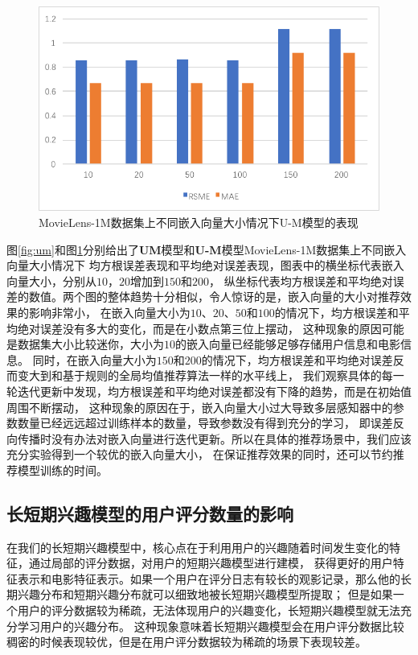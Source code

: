 \begin{figure}[htbp]
    \centering
    \includegraphics[scale=0.7]{images/U_M.pdf}
    \caption{MovieLens-1M数据集上不同嵌入向量大小情况下U-M模型的表现}
    \label{fig:u_m}
\end{figure}

图\ref{fig:um}和图\ref{fig:u_m}分别给出了\textbf{UM}模型和\textbf{U-M}模型MovieLens-1M数据集上不同嵌入向量大小情况下
均方根误差表现和平均绝对误差表现，图表中的横坐标代表嵌入向量大小，分别从$10$，$20$增加到$150$和$200$，
纵坐标代表均方根误差和平均绝对误差的数值。两个图的整体趋势十分相似，令人惊讶的是，嵌入向量的大小对推荐效果的影响非常小，
在嵌入向量大小为$10$、$20$、$50$和$100$的情况下，均方根误差和平均绝对误差没有多大的变化，而是在小数点第三位上摆动，
这种现象的原因可能是数据集大小比较迷你，大小为$10$的嵌入向量已经能够足够存储用户信息和电影信息。
同时，在嵌入向量大小为$150$和$200$的情况下，均方根误差和平均绝对误差反而变大到和基于规则的全局均值推荐算法一样的水平线上，
我们观察具体的每一轮迭代更新中发现，均方根误差和平均绝对误差都没有下降的趋势，而是在初始值周围不断摆动，
这种现象的原因在于，嵌入向量大小过大导致多层感知器中的参数数量已经远远超过训练样本的数量，导致参数没有得到充分的学习，
即误差反向传播时没有办法对嵌入向量进行迭代更新。所以在具体的推荐场景中，我们应该充分实验得到一个较优的嵌入向量大小，
在保证推荐效果的同时，还可以节约推荐模型训练的时间。

\subsection{长短期兴趣模型的用户评分数量的影响}
在我们的长短期兴趣模型中，核心点在于利用用户的兴趣随着时间发生变化的特征，通过局部的评分数据，对用户的短期兴趣模型进行建模，
获得更好的用户特征表示和电影特征表示。如果一个用户在评分日志有较长的观影记录，那么他的长期兴趣分布和短期兴趣分布就可以细致地被长短期兴趣模型所提取；
但是如果一个用户的评分数据较为稀疏，无法体现用户的兴趣变化，长短期兴趣模型就无法充分学习用户的兴趣分布。
这种现象意味着长短期兴趣模型会在用户评分数据比较稠密的时候表现较优，但是在用户评分数据较为稀疏的场景下表现较差。

